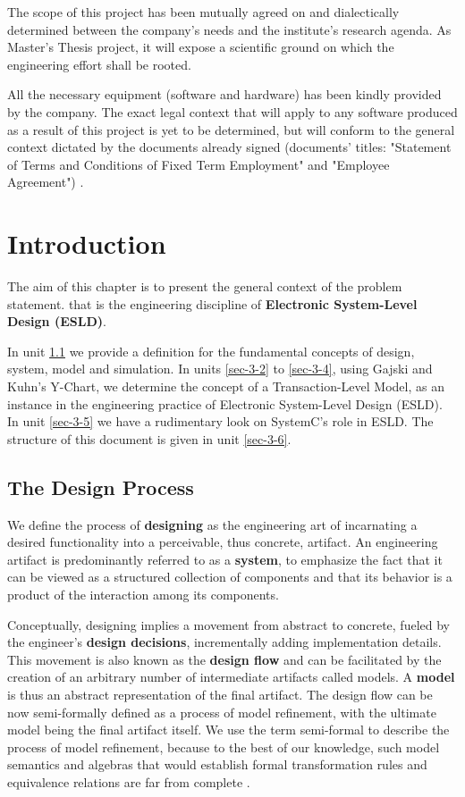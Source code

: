 \documentclass[12pt,twoside]{article}
\begin{document}
The scope of this project has been mutually agreed on and dialectically determined between the company's needs and the institute's research agenda.
As Master's Thesis project, it will expose a scientific ground on which the engineering effort shall be rooted.

All the necessary equipment (software and hardware) has been kindly provided by the company.
The exact legal context that will apply to any software produced as a result of this project is yet to be determined, 
but will conform to the general context dictated by the documents already signed (documents' titles:  "Statement of Terms and Conditions of Fixed Term Employment" and "Employee Agreement") .
\clearpage


\section{Introduction}
\label{sec-3}
The aim of this chapter is to present the general context of the problem statement.
that is the engineering discipline of \textbf{Electronic System-Level Design (ESLD)}.

In unit \ref{sec-3-1} we provide a definition for the fundamental concepts of design, system, model and simulation.
In units \ref{sec-3-2} to \ref{sec-3-4}, using Gajski and Kuhn's Y-Chart, we determine the concept of a Transaction-Level Model, as an instance in the engineering practice of Electronic System-Level Design (ESLD).
In unit \ref{sec-3-5} we have a rudimentary look on SystemC's role in ESLD.
The structure of this document is given in unit \ref{sec-3-6}.

\subsection{The Design Process}
\label{sec-3-1}
We define the process of \textbf{designing} as the engineering art of incarnating a desired functionality into a perceivable, thus concrete, artifact.
An engineering artifact is predominantly referred to as a \textbf{system}, 
to emphasize the fact that it can be viewed as a structured collection of components and that its behavior is a product of the interaction among its components.

Conceptually, designing implies a movement from abstract to concrete, fueled by the engineer's \textbf{design decisions}, incrementally adding implementation details.
This movement is also known as the \textbf{design flow} and can be facilitated by the creation of an arbitrary number of intermediate artifacts called models.
A \textbf{model} is thus an abstract representation of the final artifact. 
The design flow can be now semi-formally defined as a process of model refinement, with the ultimate model being the final artifact itself.
We use the term semi-formal to describe the process of model refinement, because to the best of our knowledge, 
such model semantics and algebras that would establish formal transformation rules and equivalence relations are far from complete \cite{Gajski2009}.
\end{document}
